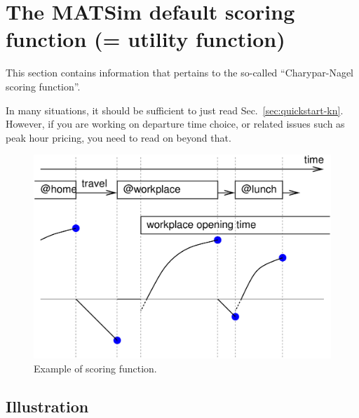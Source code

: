\chapter{The MATSim default scoring function (= utility function)}


\def\betaperf{\beta_{\it perf}}

\bigskip




This section contains information that pertains to the so-called ``Charypar-Nagel scoring function''.

In many situations, it should be sufficient to just read Sec.~\ref{sec:quickstart-kn}.  However, if you are working on departure time choice, or related issues such as peak hour pricing, you need to read on beyond that.

\vfill\eject

\begin{figure}[h]
\centerline{%
\includegraphics[width=0.6\hsize]{figures/scoringFunction/scoring-example-wo-marginal}
}
\caption{Example of scoring function.}
\label{fig:scoring-example-wo-marginal}
\end{figure}

\section{Illustration}

